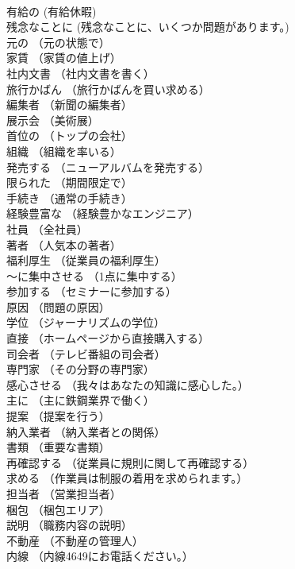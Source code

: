 \documentclass[8pt]{extreport}
\begin{document}
\begin{CJK}{UTF8}{min}
\\	有給の	(有給休暇)		
\\	残念なことに	(残念なことに、いくつか問題があります。)		
\\	元の	（元の状態で）		
\\	家賃	（家賃の値上げ）		
\\	社内文書	（社内文書を書く）		
\\	旅行かばん	（旅行かばんを買い求める）		
\\	編集者	（新聞の編集者）		
\\	展示会	（美術展）		
\\	首位の	（トップの会社）		
\\	組織	（組織を率いる）		
\\	発売する	（ニューアルバムを発売する）		
\\	限られた	（期間限定で）		
\\	手続き	（通常の手続き）		
\\	経験豊富な	（経験豊かなエンジニア）		
\\	社員	（全社員）		
\\	著者	（人気本の著者）		
\\	福利厚生	（従業員の福利厚生）		
\\	～に集中させる	（1点に集中する）		
\\	参加する	（セミナーに参加する）		
\\	原因	（問題の原因）		
\\	学位	（ジャーナリズムの学位）		
\\	直接	（ホームページから直接購入する）		
\\	司会者	（テレビ番組の司会者）		
\\	専門家	（その分野の専門家）		
\\	感心させる	（我々はあなたの知識に感心した。）		
\\	主に	（主に鉄鋼業界で働く）		
\\	提案	（提案を行う）		
\\	納入業者	（納入業者との関係）		
\\	書類	（重要な書類）		
\\	再確認する	（従業員に規則に関して再確認する）		
\\	求める	（作業員は制服の着用を求められます。）		
\\	担当者	（営業担当者）		
\\	梱包	（梱包エリア）		
\\	説明	（職務内容の説明）		
\\	不動産	（不動産の管理人）		
\\	内線	（内線4649にお電話ください。）		

\end{CJK}
\end{document}
